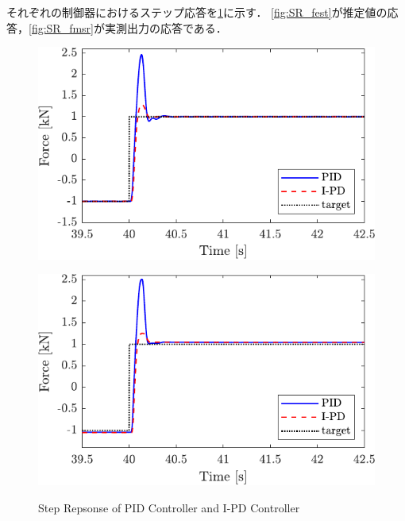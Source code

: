 それぞれの制御器におけるステップ応答を\figname\ref{fig:SRofPIDandIPD}に示す．
\figname\ref{fig:SR_fest}が推定値の応答，\figname\ref{fig:SR_fmsr}が実測出力の応答である．

\begin{figure}[tbp]
    \begin{minipage}{0.5\hsize}
        \centering
        \includegraphics[keepaspectratio, width = \linewidth]{contents/ForceControl/figure/1115_PIDandI-PDestforce_step.pdf}
        \label{fig:SR_fest}
    \end{minipage}
    \begin{minipage}{0.5\hsize}
        \centering
        \includegraphics[keepaspectratio, width = \linewidth]{contents/ForceControl/figure/1115_PIDandI-PDforce_step.pdf}
        \label{fig:SR_fmsr}
    \end{minipage}
    \caption{Step Repsonse of PID Controller and I-PD Controller}
    \label{fig:SRofPIDandIPD}
\end{figure}
